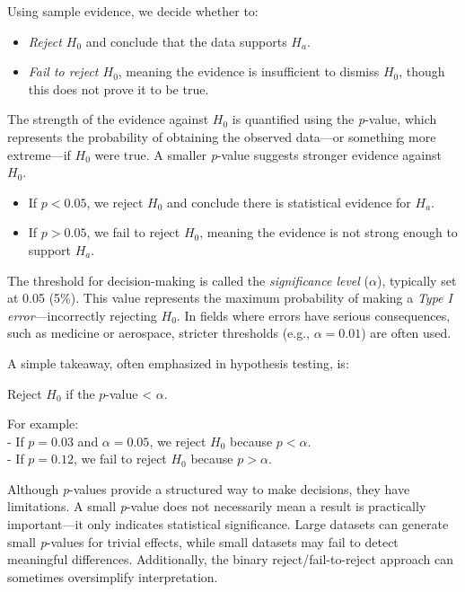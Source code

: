 \documentclass[
]{book}
\providecommand{\tightlist}{%
  \setlength{\itemsep}{0pt}\setlength{\parskip}{0pt}}
\theoremstyle{definition}
\theoremstyle{definition}
\theoremstyle{definition}
\theoremstyle{definition}
\theoremstyle{remark}
\begin{document}
Using sample evidence, we decide whether to:

\begin{itemize}
\tightlist
\item
  \emph{Reject \(H_0\)} and conclude that the data supports \(H_a\).\\
\item
  \emph{Fail to reject \(H_0\)}, meaning the evidence is insufficient to dismiss \(H_0\), though this does not prove it to be true.
\end{itemize}

The strength of the evidence against \(H_0\) is quantified using the \emph{p}-value, which represents the probability of obtaining the observed data---or something more extreme---if \(H_0\) were true. A smaller \emph{p}-value suggests stronger evidence against \(H_0\).

\begin{itemize}
\tightlist
\item
  If \(p < 0.05\), we reject \(H_0\) and conclude there is statistical evidence for \(H_a\).\\
\item
  If \(p > 0.05\), we fail to reject \(H_0\), meaning the evidence is not strong enough to support \(H_a\).
\end{itemize}

The threshold for decision-making is called the \emph{significance level} (\(\alpha\)), typically set at 0.05 (5\%). This value represents the maximum probability of making a \emph{Type I error}---incorrectly rejecting \(H_0\). In fields where errors have serious consequences, such as medicine or aerospace, stricter thresholds (e.g., \(\alpha = 0.01\)) are often used.

A simple takeaway, often emphasized in hypothesis testing, is:

Reject \(H_0\) if the \(p\)-value \textless{} \(\alpha\).

For example:\\
- If \(p = 0.03\) and \(\alpha = 0.05\), we reject \(H_0\) because \(p < \alpha\).\\
- If \(p = 0.12\), we fail to reject \(H_0\) because \(p > \alpha\).

Although \emph{p}-values provide a structured way to make decisions, they have limitations. A small \emph{p}-value does not necessarily mean a result is practically important---it only indicates statistical significance. Large datasets can generate small \emph{p}-values for trivial effects, while small datasets may fail to detect meaningful differences. Additionally, the binary reject/fail-to-reject approach can sometimes oversimplify interpretation.
\end{document}
